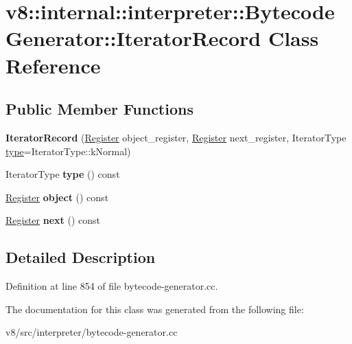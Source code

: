 \hypertarget{classv8_1_1internal_1_1interpreter_1_1BytecodeGenerator_1_1IteratorRecord}{}\section{v8\+:\+:internal\+:\+:interpreter\+:\+:Bytecode\+Generator\+:\+:Iterator\+Record Class Reference}
\label{classv8_1_1internal_1_1interpreter_1_1BytecodeGenerator_1_1IteratorRecord}
\subsection*{Public Member Functions}
\begin{DoxyCompactItemize}
\item 
\mbox{\label{classv8_1_1internal_1_1interpreter_1_1BytecodeGenerator_1_1IteratorRecord_a13a001c8da49054dc31cf12e15625263}} 
{\bfseries Iterator\+Record} (\mbox{\hyperlink{classv8_1_1internal_1_1interpreter_1_1Register}{Register}} object\+\_\+register, \mbox{\hyperlink{classv8_1_1internal_1_1interpreter_1_1Register}{Register}} next\+\_\+register, Iterator\+Type \mbox{\hyperlink{classstd_1_1conditional_1_1type}{type}}=Iterator\+Type\+::k\+Normal)
\item 
\mbox{\label{classv8_1_1internal_1_1interpreter_1_1BytecodeGenerator_1_1IteratorRecord_adece556dba1aa0258bc37c5e474b612b}} 
Iterator\+Type {\bfseries type} () const
\item 
\mbox{\label{classv8_1_1internal_1_1interpreter_1_1BytecodeGenerator_1_1IteratorRecord_a8661e500a2bc6c70d4eeeba0bda726bb}} 
\mbox{\hyperlink{classv8_1_1internal_1_1interpreter_1_1Register}{Register}} {\bfseries object} () const
\item 
\mbox{\label{classv8_1_1internal_1_1interpreter_1_1BytecodeGenerator_1_1IteratorRecord_a278e1df00b8e7d58eeb692a75cb5b8cf}} 
\mbox{\hyperlink{classv8_1_1internal_1_1interpreter_1_1Register}{Register}} {\bfseries next} () const
\end{DoxyCompactItemize}


\subsection{Detailed Description}


Definition at line 854 of file bytecode-\/generator.\+cc.



The documentation for this class was generated from the following file\+:\begin{DoxyCompactItemize}
\item 
v8/src/interpreter/bytecode-\/generator.\+cc\end{DoxyCompactItemize}
